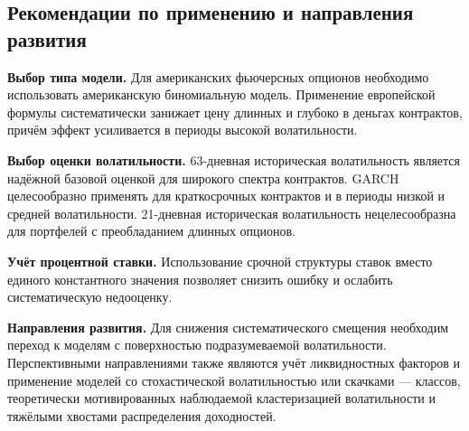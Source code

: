 \documentclass[11pt,a4paper]{article}
\begin{document}
\subsection{Рекомендации по применению и направления развития}

\textbf{Выбор типа модели.} Для американских фьючерсных опционов необходимо использовать американскую биномиальную модель. Применение европейской формулы систематически занижает цену длинных и глубоко в деньгах контрактов, причём эффект усиливается в периоды высокой волатильности.

\textbf{Выбор оценки волатильности.} 63-дневная историческая волатильность является надёжной базовой оценкой для широкого спектра контрактов. GARCH целесообразно применять для краткосрочных контрактов и в периоды низкой и средней волатильности. 21-дневная историческая волатильность нецелесообразна для портфелей с преобладанием длинных опционов.

\textbf{Учёт процентной ставки.} Использование срочной структуры ставок вместо единого константного значения позволяет снизить ошибку и ослабить систематическую недооценку.

\textbf{Направления развития.} Для снижения систематического смещения необходим переход к моделям с поверхностью подразумеваемой волатильности. Перспективными направлениями также являются учёт ликвидностных факторов и применение моделей со стохастической волатильностью или скачками --- классов, теоретически мотивированных наблюдаемой кластеризацией волатильности и тяжёлыми хвостами распределения доходностей.
\end{document}
